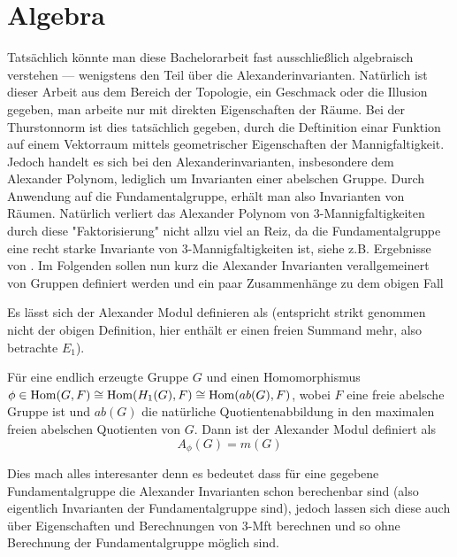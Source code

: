 
\section{Algebra}

Tatsächlich könnte man diese Bachelorarbeit fast ausschließlich algebraisch verstehen --- wenigstens den Teil über die Alexanderinvarianten. Natürlich ist dieser Arbeit aus dem Bereich der Topologie, ein Geschmack oder die Illusion gegeben, man arbeite nur mit direkten Eigenschaften der Räume. Bei der Thurstonnorm ist dies tatsächlich gegeben, durch die Deftinition einar Funktion auf einem Vektorraum mittels geometrischer Eigenschaften der Mannigfaltigkeit. Jedoch handelt es sich bei den Alexanderinvarianten, insbesondere dem Alexander Polynom, lediglich um Invarianten einer abelschen Gruppe. Durch Anwendung auf die Fundamentalgruppe, erhält man also Invarianten von Räumen. Natürlich verliert das Alexander Polynom von 3-Mannigfaltigkeiten durch diese "Faktorisierung" nicht allzu viel an Reiz, da die Fundamentalgruppe eine recht starke Invariante von 3-Mannigfaltigkeiten ist, siehe z.B. Ergebnisse von  . Im Folgenden sollen nun kurz die Alexander Invarianten verallgemeinert von Gruppen definiert werden und ein paar Zusammenhänge zu dem obigen Fall

Es lässt sich der Alexander Modul definieren als (entspricht strikt genommen nicht der obigen Definition, hier enthält er einen freien Summand mehr, also betrachte $E_1$).

\begin{defn}
	Für eine endlich erzeugte Gruppe $G$ und einen Homomorphismus $\phi \in \operatorname{Hom}(G,F) \cong \operatorname{Hom}(H_1(G),F) \cong \operatorname{Hom}(ab(G),F)$, wobei $F$ eine freie abelsche Gruppe ist und $ab(G)$ die natürliche Quotientenabbildung in den maximalen freien abelschen Quotienten von $G$. Dann ist der Alexander Modul definiert als
	\[
		A_\phi(G)=m(G)
	\]
\end{defn}

Dies mach alles interesanter denn es bedeutet dass für eine gegebene Fundamentalgruppe die Alexander Invarianten schon berechenbar sind (also eigentlich Invarianten der Fundamentalgruppe sind), jedoch lassen sich diese auch über Eigenschaften und Berechnungen von 3-Mft berechnen und so ohne Berechnung der Fundamentalgruppe möglich sind. 


